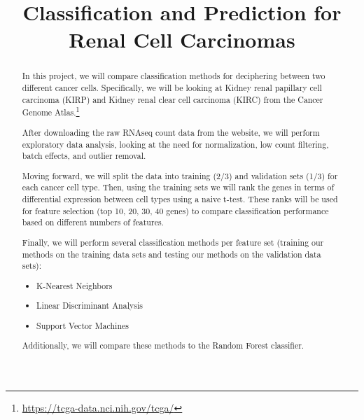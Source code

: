 



\begin{frontmatter}

\title{Classification and Prediction for Renal Cell Carcinomas}




\begin{abstract}

In this project, we will compare classification methods for deciphering between 
two different cancer cells. Specifically, we will be looking at Kidney renal 
papillary cell carcinoma (KIRP) and Kidney renal clear cell carcinoma (KIRC) 
from the Cancer Genome Atlas.\footnote{\url{https://tcga-data.nci.nih.gov/tcga/}}

After downloading the raw RNAseq count data from the website, we will perform 
exploratory data analysis, looking at the need for normalization, low count 
filtering, batch effects, and outlier removal.

Moving forward, we will split the data into training (2/3) and validation sets
(1/3) for each cancer cell type. Then, using the training sets we will rank the
genes in terms of differential expression between cell types using a naive
t-test. These ranks will be used for feature selection (top 10, 20, 30, 40 genes)
to compare classification performance based on different numbers of features.

Finally, we will perform several classification methods per feature set
(training our methods on the training data sets and testing our methods on the 
validation data sets):
\begin{itemize}
\item K-Nearest Neighbors
\item Linear Discriminant Analysis
\item Support Vector Machines
\end{itemize}
Additionally, we will compare these methods to the Random Forest classifier.

 
\end{abstract}

\begin{keyword}
\end{keyword}

\end{frontmatter}


